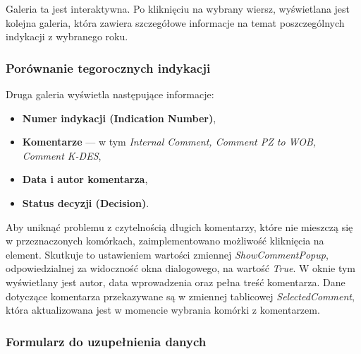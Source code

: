 Galeria ta jest interaktywna. Po kliknięciu na wybrany wiersz, wyświetlana jest kolejna galeria, która zawiera szczegółowe informacje na temat poszczególnych indykacji z wybranego roku.

\subsubsection*{Porównanie tegorocznych indykacji}

Druga galeria wyświetla następujące informacje:
\begin{itemize}
\item \textbf{Numer indykacji (Indication Number)},
\item \textbf{Komentarze} — w tym \emph{Internal Comment, Comment PZ to WOB, Comment K-DES},
\item \textbf{Data i autor komentarza},
\item \textbf{Status decyzji (Decision)}.
\end{itemize}

Aby uniknąć problemu z czytelnością długich komentarzy, które nie mieszczą się w przeznaczonych komórkach, zaimplementowano możliwość kliknięcia na element. Skutkuje to ustawieniem wartości zmiennej \emph{ShowCommentPopup}, odpowiedzialnej za widoczność okna dialogowego, na wartość \emph{True}. W oknie tym wyświetlany jest autor, data wprowadzenia oraz pełna treść komentarza. Dane dotyczące komentarza przekazywane są w zmiennej tablicowej \emph{SelectedComment}, która aktualizowana jest w momencie wybrania komórki z komentarzem.

\subsubsection*{Formularz do uzupełnienia danych}

